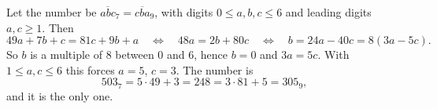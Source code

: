 Let the number be $\overline{abc}_7=\overline{cba}_9$, with digits $0\le a,b,c\le6$ and leading digits $a,c\ge1$. Then
\[
49a+7b+c=81c+9b+a\quad\Longleftrightarrow\quad48a=2b+80c\quad\Longleftrightarrow\quad b=24a-40c=8(3a-5c).
\]
So $b$ is a multiple of $8$ between $0$ and $6$, hence $b=0$ and $3a=5c$. With $1\le a,c\le6$ this forces $a=5$, $c=3$. The number is
\[
\boxed{503_7}=5\cdot49+3=248=3\cdot81+5=305_9 ,
\]
and it is the only one.
